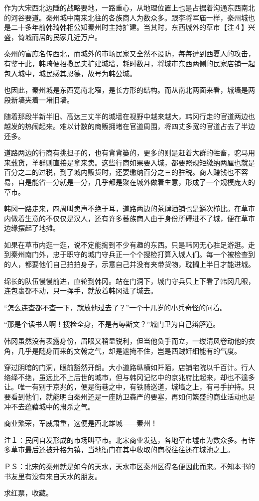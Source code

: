 作为大宋西北边陲的战略要地，一路重心，从地理位置上也是占据着沟通东西南北的河谷要道。秦州城中南来北往的各族商人为数众多。跟李将军庙一样，秦州城也是二十多年前韩琦韩相公知秦州时主持扩建。当其时，东西城外的草市【注４】兴盛，倚城而居的民家几近万户。

秦州的富庶名传西北，而城外的市场民家又全然不设防，每每遭到西夏人的攻击，有鉴于此，韩琦便招揽民夫扩建城墙，耗时数月，将城市东西两侧的民家店铺一起包入城中，城民感其恩德，故号为韩公城。

也因此，秦州城是东西宽南北窄，是长方形的结构。而从南北两面来看，城墙是两段新墙夹着一堵旧墙。

随着那段半新半旧、高达三丈半的城墙在视野中越来越大，韩冈行走的官道两边也越发的热闹起来。难以计数的商贩拥堵在官道周围，将四丈多宽的官道占去了半边还多。

道路两边的行商有挑担子的，也有背背篓的，更多的则是赶着大群的牲畜，驼马用来载货，羊群则直接是拿来卖。这些行商如果要入城，都要照规矩缴纳两厘也就是百分之二的过税，到了城内贩货时，还要缴纳百分之三的驻税。商人赚钱也不容易，自是能省一分就是一分，几乎都是聚在城外做着生意，形成了一个规模庞大的草市。

韩冈一路走来，四周叫卖声不绝于耳，道路两边的茶肆酒铺也是鳞次栉比。在草市内做着生意的不仅仅是汉人，还有许多蕃族商人由于身份所碍进不了城，便在草市边缘摆起了地摊。

如果在草市内逛一逛，说不定能掏到不少有趣的东西。只是韩冈无心驻足游逛。走到秦州南门外，忠于职守的城门守兵正一个个搜检打算入城人们。每一个被检查到的人，都要他们自己拍拍身子，示意自己并没有夹带货物，耽搁上半日才能进城。

绵长的队伍慢慢前进，直轮到韩冈。站在门洞下，城门守兵只上下看了韩冈几眼，连包裹都不动，只一挥手，就放着韩冈进了城去。

“怎么连查都不查一下，就放他过去了？”一个十几岁的小兵奇怪的问着。

“那是个读书人啊！搜检全身，不是有辱斯文？”城门卫为自己辩解道。

韩冈虽然没有表露身份，眉眼又稍显锐利，但当他负手而立，一缕清风卷动他的衣角，几乎是随身而来的文翰之气，却是遮掩不住，岂是西贼奸细能有的气度。

穿过阴暗的门洞，眼前豁然开朗。大小道路纵横如阡陌，店铺宅院以千百计。行人络绎不绝，虽远比不上后世的城市，但与韩冈记忆中的京兆府比起来，却也不遑多让。唯一有别于京兆的，便是街巷之中，有铁骑巡道，城墙之上，有弓手护持。只要看到他们，就能明白秦州还是一座防卫森严的要塞，再如何繁盛的商业活动也是冲不去蕴藉城中的肃杀之气。

商业繁荣，军威肃重，这便是西北雄城——秦州！

注１：民间自发形成的市场叫草市。北宋商业发达，各地草市墟市为数众多。有许多草市最后还被升格为镇，当地衙门在其中收取的商税往往还在城池之上。

ＰＳ：北宋的秦州就是如今的天水，天水市区秦州区得名便因此而来。不知本书的书友里有没有来自天水的朋友。

求红票，收藏。


